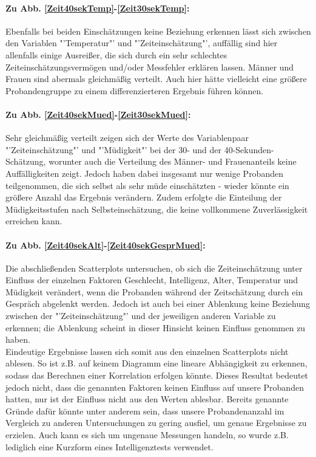\documentclass{Paper}
\begin{document}
\paragraph{Zu Abb. \ref{Zeit40sekTemp}-\ref{Zeit30sekTemp}:} Ebenfalls bei beiden Einschätzungen keine Beziehung erkennen lässt sich zwischen den Variablen "'Temperatur"' und "'Zeiteinschätzung"', auffällig sind hier allenfalls einige Ausreißer, die sich durch ein sehr schlechtes Zeiteinschätzungsvermögen und/oder Messfehler erklären lassen. Männer und Frauen sind abermals gleichmäßig verteilt. Auch hier hätte vielleicht eine größere Probandengruppe zu einem differenzierteren Ergebnis führen können.

\paragraph{Zu Abb. \ref{Zeit40sekMued}-\ref{Zeit30sekMued}:} Sehr gleichmäßig verteilt zeigen sich der Werte des Variablenpaar "'Zeiteinschätzung"' und "'Müdigkeit"' bei der 30- und der 40-Sekunden-Schätzung, worunter auch die Verteilung des Männer- und Frauenanteils keine Auffälligkeiten zeigt. Jedoch haben dabei insgesamt nur wenige Probanden teilgenommen, die sich selbst als sehr müde einschätzten - wieder könnte ein größere Anzahl das Ergebnis verändern. Zudem erfolgte die Einteilung der Müdigkeitsstufen nach Selbsteinschätzung, die keine vollkommene Zuverlässigkeit erreichen kann. 

\paragraph{Zu Abb. \ref{Zeit40sekAlt}-\ref{Zeit40sekGesprMued}:} Die abschließenden Scatterplots untersuchen, ob sich die Zeiteinschätzung unter Einfluss der einzelnen Faktoren Geschlecht, Intelligenz, Alter, Temperatur und Müdigkeit verändert, wenn die Probanden während der Zeitschätzung durch ein Gespräch abgelenkt werden. Jedoch ist auch bei einer Ablenkung keine Beziehung zwischen der "'Zeiteinschätzung"' und der jeweiligen anderen Variable zu erkennen; die Ablenkung scheint in dieser Hinsicht keinen Einfluss genommen zu haben.\\ 

Eindeutige Ergebnisse lassen sich somit aus den einzelnen Scatterplots nicht ablesen. So ist z.B. auf keinem Diagramm eine lineare Abhängigkeit zu erkennen, sodass das Berechnen einer Korrelation erfolgen könnte. Dieses Resultat bedeutet jedoch nicht, dass die genannten Faktoren keinen Einfluss auf unsere Probanden hatten, nur ist der Einfluss nicht aus den Werten ablesbar. Bereits genannte Gründe dafür könnte unter anderem sein, dass unsere Probandenanzahl im Vergleich zu anderen Untersuchungen zu gering ausfiel, um genaue Ergebnisse zu erzielen. Auch kann es sich um ungenaue Messungen handeln, so wurde z.B. lediglich eine Kurzform eines Intelligenztests verwendet.
\end{document}
